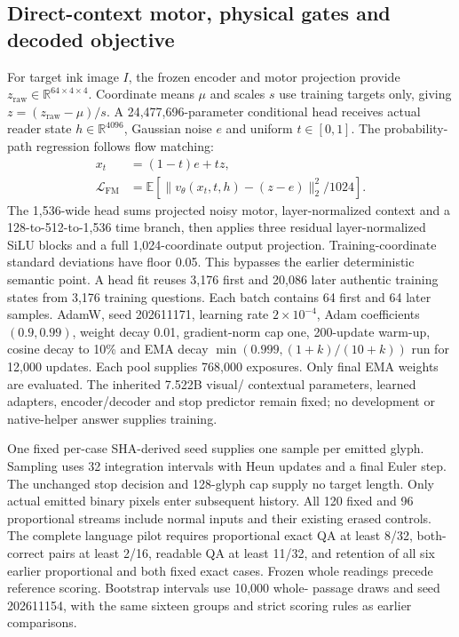 \documentclass[12pt,a4paper]{article}
\providecommand{\DIFadd}[1]{{\protect\color{blue} \sf #1}} %
\begin{document}
\subsection*{\DIFadd{Direct-context motor, physical gates and decoded objective}}
\DIFadd{For target ink image $I$, the frozen encoder and motor projection provide
$z_\mathrm{raw}\in\mathbb R^{64\times4\times4}$. Coordinate means $\mu$ and
scales $s$ use training targets only, giving $z=(z_\mathrm{raw}-\mu)/s$.
A 24,477,696-parameter conditional head receives actual reader state
$h\in\mathbb R^{4096}$, Gaussian noise $e$ and uniform $t\in[0,1]$.
The probability-path regression follows flow matching\cite{flowmatching}:
}\begin{align}
 x_t&=(1-t)e+tz,\\
 \mathcal L_\mathrm{FM}&=\mathbb E\!\left[
 \|v_\theta(x_t,t,h)-(z-e)\|_2^2/1024\right].
\end{align}
\DIFadd{The 1,536-wide head sums projected noisy motor, layer-normalized context
and a 128-to-512-to-1,536 time branch, then applies three residual
layer-normalized SiLU blocks and a full 1,024-coordinate output projection.
Training-coordinate standard deviations have floor 0.05. This bypasses the
earlier deterministic semantic point. A head fit reuses 3,176 first and 20,086 later authentic
training states from 3,176 training questions. Each batch contains 64 first
and 64 later samples. AdamW, seed 202611171, learning rate $2\times10^{-4}$,
Adam coefficients $(0.9,0.99)$, weight decay 0.01, gradient-norm cap one,
200-update warm-up, cosine decay to 10\% and EMA decay
$\min(0.999,(1+k)/(10+k))$ run for 12,000 updates. Each pool supplies 768,000
exposures. Only final EMA weights are evaluated. The inherited 7.522B visual/
contextual parameters, learned adapters, encoder/decoder and stop predictor
remain fixed; no development or native-helper answer supplies training.
}

\DIFadd{One fixed per-case SHA-derived seed supplies one sample per emitted glyph.
Sampling uses 32 integration intervals with Heun updates and a final Euler
step. The unchanged stop decision and 128-glyph cap supply no target length.
Only actual emitted binary pixels enter subsequent history. All 120 fixed
and 96 proportional streams include normal inputs and their existing erased
controls. The complete language pilot requires proportional exact QA at least
8/32, both-correct pairs at least 2/16, readable QA at least 11/32, and retention
of all six earlier proportional and both fixed exact cases. Frozen whole
readings precede reference scoring. Bootstrap intervals use 10,000 whole-
passage draws and seed 202611154, with the same sixteen groups and strict
scoring rules as earlier comparisons.
}
\end{document}
